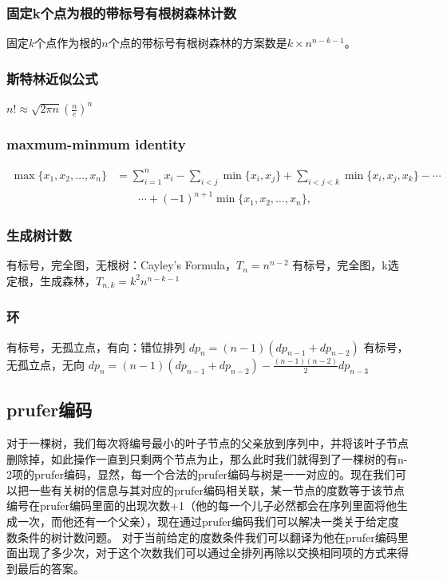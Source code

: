 \documentclass[UTF8,a4paper,titlepage]{ctexart}
\begin{document}
\subsubsection*{固定k个点为根的带标号有根树森林计数}
        固定$k$个点作为根的$n$个点的带标号有根树森林的方案数是$k\times n^{n-k-1}$。
\subsubsection*{斯特林近似公式}
        $n!\approx\sqrt{2\pi n}(\frac{n}{e})^n$

\subsubsection*{maxmum-minmum identity}
\begin{equation}
\begin{aligned}
\max\{x_{1},x_{2},\ldots ,x_{{n}}\}&=\sum _{{i=1}}^{n}x_{i}-\sum _{{i<j}}\min\{x_{i},x_{j}\}+\sum _{{i<j<k}}\min\{x_{i},x_{j},x_{k}\}-\cdots \\&\qquad \cdots +\left(-1\right)^{{n+1}}\min\{x_{1},x_{2},\ldots ,x_{n}\},
\end{aligned}
\end{equation}
\subsubsection*{生成树计数}
	有标号，完全图，无根树：Cayley's Formula，$T_n=n^{n-2}$
	有标号，完全图，k选定根，生成森林，$T_{n,k}=k^2n^{n-k-1}$
\subsubsection*{环}
	有标号，无孤立点，有向：错位排列 $dp_{n}=(n-1)(dp_{n-1}+dp_{n-2})$	
	有标号，无孤立点，无向	$dp_{n}=(n-1)(dp_{n-1}+dp_{n-2})-\frac{(n-1)(n-2)}{2}dp_{n-3}$
\subsection{prufer编码}
	对于一棵树，我们每次将编号最小的叶子节点的父亲放到序列中，并将该叶子节点删除掉，如此操作一直到只剩两个节点为止，那么此时我们就得到了一棵树的有n-2项的prufer编码，显然，每一个合法的prufer编码与树是一一对应的。现在我们可以把一些有关树的信息与其对应的prufer编码相关联，某一节点的度数等于该节点编号在prufer编码里面的出现次数+1（他的每一个儿子必然都会在序列里面将他生成一次，而他还有一个父亲），现在通过prufer编码我们可以解决一类关于给定度数条件的树计数问题。
	对于当前给定的度数条件我们可以翻译为他在prufer编码里面出现了多少次，对于这个次数我们可以通过全排列再除以交换相同项的方式来得到最后的答案。
\end{document}
